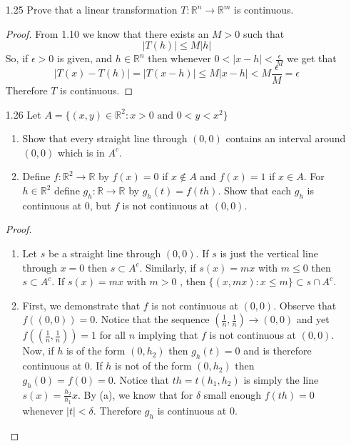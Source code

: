 \begin{enumerate}
    \item[1.25] Prove that a linear transformation \( T: \mathbb{R}^n \rightarrow \mathbb{R}^m \) is continuous.
    
    \begin{proof}
    From 1.10 we know that there exists an \( M >0 \) such that
    \[
    \left| T(h) \right| \leq M \left| h \right|
    \]
    So, if \( \epsilon > 0 \) is given, and \( h \in \mathbb{R}^n \) then whenever \( 0 < \left| x-h \right| < \frac{\epsilon}{M} \) we get that
    \[
    \left| T(x) - T(h) \right| = \left| T(x-h) \right| \leq M \left| x-h \right| < M \frac{\epsilon}{M} = \epsilon
    \]
    Therefore \( T \) is continuous. 
    \end{proof}
    
    \item[1.26] Let \( A = \{ (x,y)\in \mathbb{R}^2: x>0 \text{ and } 0<y<x^2 \} \)
    \begin{enumerate}
        \item Show that every straight line through \( (0,0) \) contains an interval around \( (0,0) \) which is in \( A^c \).
        \item Define \( f:\mathbb{R}^2 \rightarrow \mathbb{R} \) by \( f(x) = 0 \) if \( x \not\in A \) and \( f(x) =1 \) if \( x \in A \). For \( h \in \mathbb{R}^2 \) define \( g_h: \mathbb{R} \rightarrow \mathbb{R} \) by \( g_h(t) = f(th) \). Show that each \( g_h \) is continuous at \( 0 \), but \( f \) is not continuous at \( (0,0) \).
    \end{enumerate}
    
    \begin{proof}
    \begin{enumerate}
        \item Let \( s \) be a straight line through \( (0,0) \). If \( s \) is just the vertical line through \( x=0 \) then \( s \subset A^c \). Similarly, if \( s(x) = mx \) with \( m \leq 0 \) then \( s \subset A^c \). If \( s(x) = mx \) with \( m>0 \) , then  \( \{ (x,mx) : x\leq m \} \subset s \cap A^c \).
        
        \item First, we demonstrate that \( f \) is not continuous at \( (0,0) \). Observe that \( f((0,0)) = 0 \). Notice that the sequence \( \left( \frac{1}{n}, \frac{1}{n} \right) \rightarrow (0,0) \) and yet \( f\left( \left( \frac{1}{n}, \frac{1}{n} \right) \right) = 1 \) for all \( n \) implying that \( f \) is not continuous at \( (0,0) \). Now, if \( h \) is of the form \( (0,h_2) \) then \( g_h(t) = 0 \) and is therefore continuous at \( 0 \). If \( h \) is not of the form \( (0,h_2) \) then \( g_h(0) = f(0) = 0 \). Notice that \( th = t(h_1,h_2) \) is simply the line \( s(x) = \frac{h_2}{h_1}x \). By (a), we know that for \( \delta \) small enough \( f(th) = 0 \) whenever \( \vert t \vert < \delta \). Therefore \( g_h \) is continuous at \( 0 \). 
    \end{enumerate}
    \end{proof}
    

\end{enumerate}
